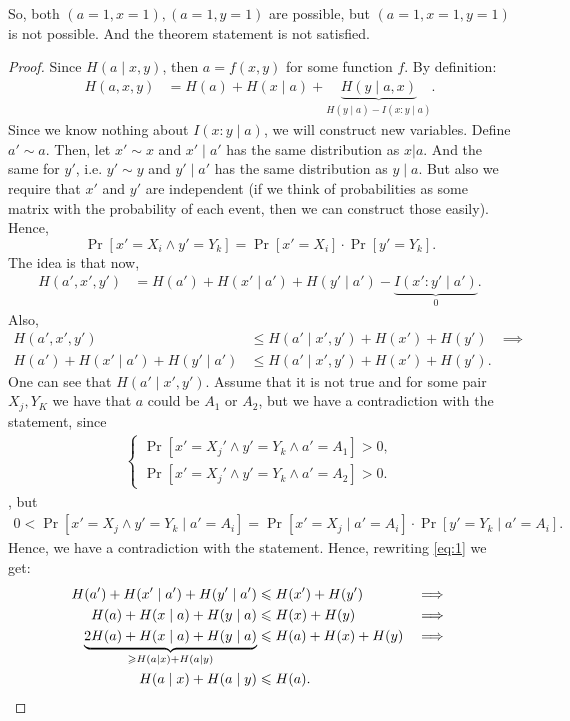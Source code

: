 So, both $(a = 1, x = 1), (a = 1, y = 1)$ are possible, but  $(a = 1, x = 1, y = 1)$ is not possible.
And the theorem statement is not satisfied.
\begin{proof}
	Since $H(a  \mid x, y)$, then $a = f(x, y)$ for some function  $f$. 
	By definition:
	\begin{align*}
		H(a, x, y) &= H(a) + H(x  \mid a) + \underbrace{H(y  \mid a, x)}_{H(y  \mid a) - I(x : y  \mid a)}.
	\end{align*}
	Since we know nothing about $I(x : y  \mid a)$, we will construct new variables.
	Define $a' \sim a$.
	Then, let  $x' \sim x$ and  $x'  \mid a'$ has the same distribution as $x | a$.
	And the same for $y'$, i.e. $y' \sim y$ and $y'  \mid a'$ has the same distribution as $y  \mid a$.
	But also we require that $x'$ and  $y'$ are independent (if we think of probabilities as some matrix with the probability of each event, then we can construct those easily).
	Hence,
	 \[
		 \Pr[x' = X_i \land y' = Y_k] = \Pr[x' = X_i] \cdot \Pr[y' = Y_k]
	.\] 
	The idea is that now,
	\begin{align*}
		H(a', x', y') &= H(a') + H(x'  \mid a') + H(y'  \mid a') - \underbrace{I(x' : y'  \mid a')}_{0}.
	\end{align*}
	Also,
	\begin{align}
		H(a', x', y') &\leq H(a'  \mid x', y') + H(x') + H(y') &\implies \nonumber \\
		H(a') + H(x'  \mid a') + H(y'  \mid a') &\leq H(a'  \mid  x', y') + H(x') + H(y') \label{eq:1}
	.\end{align}
	One can see that $H(a'  \mid x', y')$.
	Assume that it is not true and for some pair $X_{j}, Y_K$ we have that $a$ could be  $A_1$ or $A_2$, but we have a contradiction with the statement, since
	\begin{align*}
		\begin{cases}
			\Pr[x' = X_j' \land y' = Y_k \land a' = A_1] > 0, \\
			\Pr[x' = X_j' \land y' = Y_k \land a' = A_2] > 0.
		\end{cases}
	\end{align*},
	but
	\begin{align*}
		0 < \Pr[x' = X_j \land y' = Y_k  \mid a' = A_i] = \Pr[x' = X_j  \mid a' = A_i] \cdot \Pr[y' = Y_k  \mid a' = A_i]
	.\end{align*}
	Hence, we have a contradiction with the statement.
	Hence, rewriting \eqref{eq:1} we get:
	\begin{align*}
		H(a') + H(x'  \mid a') + H(y'  \mid a') &\leq H(x') + H(y') &\implies \\
		H(a) + H(x  \mid a) + H(y  \mid a) &\leq H(x) + H(y) &\implies \\
		\underbrace{2H(a) + H(x  \mid a) + H(y  \mid a)}_{\geq H(a  \mid x) + H(a  \mid y)} &\leq H(a) + H(x) + H(y) &\implies \\
		H(a  \mid x) + H(a  \mid y) &\leq H(a)
	.&\qedhere\end{align*}
\end{proof}


